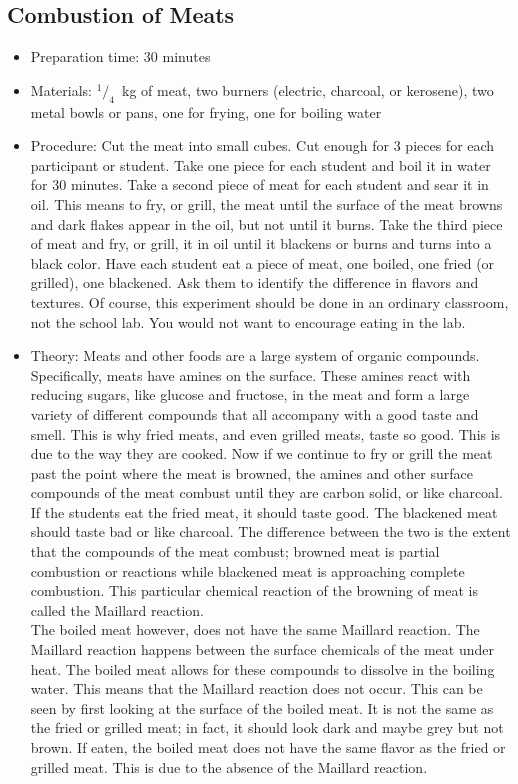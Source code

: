\subsection{Combustion of Meats}
\begin{itemize}
\item{Preparation time: 30 minutes}
\item{Materials: $^1/_4$~kg of meat, two burners (electric, charcoal, or kerosene), two metal bowls or pans, one for frying, one for boiling water}
\item{Procedure: Cut the meat into small cubes. Cut enough for 3 pieces for each participant or student. Take one piece for each student and boil it in water for 30 minutes. Take a second piece of meat for each student and sear it in oil. This means to fry, or grill, the meat until the surface of the meat browns and dark flakes appear in the oil, but not until it burns. Take the third piece of meat and fry, or grill, it in oil until it blackens or burns and turns into a black color. Have each student eat a piece of meat, one boiled, one fried (or grilled), one blackened. Ask them to identify the difference in flavors and textures. Of course, this experiment should be done in an ordinary classroom, not the school lab. You would not want to encourage eating in the lab.}
\item{Theory: Meats and other foods are a large system of organic compounds. Specifically, meats have amines on the surface. These amines react with reducing sugars, like glucose and fructose, in the meat and form a large variety of different compounds that all accompany with a good taste and smell. This is why fried meats, and even grilled meats, taste so good. This is due to the way they are cooked. Now if we continue to fry or grill the meat past the point where the meat is browned, the amines and other surface compounds of the meat combust until they are carbon solid, or like charcoal. If the students eat the fried meat, it should taste good. The blackened meat should taste bad or like charcoal. The difference between the two is the extent that the compounds of the meat combust; browned meat is partial combustion or reactions while blackened meat is approaching complete combustion. This particular chemical reaction of the browning of meat is called the Maillard reaction.\\
The boiled meat however, does not have the same Maillard reaction. The Maillard reaction happens between the surface chemicals of the meat under heat. The boiled meat allows for these compounds to dissolve in the boiling water. This means that the Maillard reaction does not occur. This can be seen by first looking at the surface of the boiled meat. It is not the same as the fried or grilled meat; in fact, it should look dark and maybe grey but not brown. If eaten, the boiled meat does not have the same flavor as the fried or grilled meat. This is due to the absence of the Maillard reaction.}
\end{itemize}

